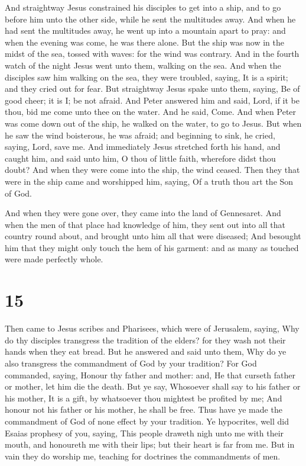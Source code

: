  And straightway Jesus constrained his disciples to get
into a ship, and to go before him unto the other side, while he sent the
multitudes away.  And when he had sent the multitudes
away, he went up into a mountain apart to pray: and when the evening was
come, he was there alone.  But the ship was now in the
midst of the sea, tossed with waves: for the wind was contrary.
 And in the fourth watch of the night Jesus went unto
them, walking on the sea.  And when the disciples saw him
walking on the sea, they were troubled, saying, It is a spirit; and they
cried out for fear.  But straightway Jesus spake unto
them, saying, Be of good cheer; it is I; be not afraid. 
And Peter answered him and said, Lord, if it be thou, bid me come unto
thee on the water.  And he said, Come. And when Peter was
come down out of the ship, he walked on the water, to go to Jesus.
 But when he saw the wind boisterous, he was afraid; and
beginning to sink, he cried, saying, Lord, save me.  And
immediately Jesus stretched forth his hand, and caught him, and said
unto him, O thou of little faith, wherefore didst thou doubt?
 And when they were come into the ship, the wind ceased.
 Then they that were in the ship came and worshipped him,
saying, Of a truth thou art the Son of God.

 And when they were gone over, they came into the land of
Gennesaret.  And when the men of that place had knowledge
of him, they sent out into all that country round about, and brought
unto him all that were diseased;  And besought him that
they might only touch the hem of his garment: and as many as touched
were made perfectly whole.

\hypertarget{section-14}{%
\section{15}\label{section-14}}

 Then came to Jesus scribes and Pharisees, which were of
Jerusalem, saying,  Why do thy disciples transgress the
tradition of the elders? for they wash not their hands when they eat
bread.  But he answered and said unto them, Why do ye also
transgress the commandment of God by your tradition?  For
God commanded, saying, Honour thy father and mother: and, He that
curseth father or mother, let him die the death.  But ye
say, Whosoever shall say to his father or his mother, It is a gift, by
whatsoever thou mightest be profited by me;  And honour
not his father or his mother, he shall be free. Thus have ye made the
commandment of God of none effect by your tradition.  Ye
hypocrites, well did Esaias prophesy of you, saying,  This
people draweth nigh unto me with their mouth, and honoureth me with
their lips; but their heart is far from me.  But in vain
they do worship me, teaching for doctrines the commandments of men.

